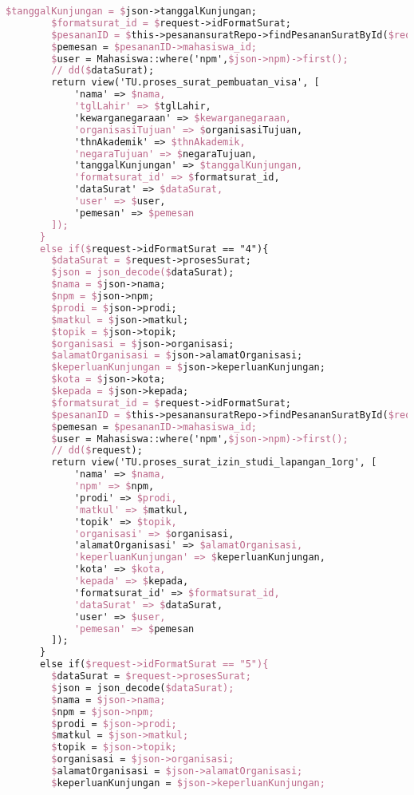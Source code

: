 \begin{lstlisting}[language=tex,basicstyle=\tiny,caption=PesanansuratController.php]
        $tanggalKunjungan = $json->tanggalKunjungan;
        $formatsurat_id = $request->idFormatSurat;
        $pesananID = $this->pesanansuratRepo->findPesananSuratById($request->id);
        $pemesan = $pesananID->mahasiswa_id;
        $user = Mahasiswa::where('npm',$json->npm)->first();
        // dd($dataSurat);
        return view('TU.proses_surat_pembuatan_visa', [
            'nama' => $nama,
            'tglLahir' => $tglLahir,
            'kewarganegaraan' => $kewarganegaraan,
            'organisasiTujuan' => $organisasiTujuan,
            'thnAkademik' => $thnAkademik,
            'negaraTujuan' => $negaraTujuan,
            'tanggalKunjungan' => $tanggalKunjungan,
            'formatsurat_id' => $formatsurat_id,
            'dataSurat' => $dataSurat,
            'user' => $user,
            'pemesan' => $pemesan
        ]);
      }
      else if($request->idFormatSurat == "4"){
        $dataSurat = $request->prosesSurat;
        $json = json_decode($dataSurat);
        $nama = $json->nama;
        $npm = $json->npm;
        $prodi = $json->prodi;
        $matkul = $json->matkul;
        $topik = $json->topik;
        $organisasi = $json->organisasi;
        $alamatOrganisasi = $json->alamatOrganisasi;
        $keperluanKunjungan = $json->keperluanKunjungan;
        $kota = $json->kota;
        $kepada = $json->kepada;
        $formatsurat_id = $request->idFormatSurat;
        $pesananID = $this->pesanansuratRepo->findPesananSuratById($request->id);
        $pemesan = $pesananID->mahasiswa_id;
        $user = Mahasiswa::where('npm',$json->npm)->first();
        // dd($request);
        return view('TU.proses_surat_izin_studi_lapangan_1org', [
            'nama' => $nama,
            'npm' => $npm,
            'prodi' => $prodi,
            'matkul' => $matkul,
            'topik' => $topik,
            'organisasi' => $organisasi,
            'alamatOrganisasi' => $alamatOrganisasi,
            'keperluanKunjungan' => $keperluanKunjungan,
            'kota' => $kota,
            'kepada' => $kepada,
            'formatsurat_id' => $formatsurat_id,
            'dataSurat' => $dataSurat,
            'user' => $user,
            'pemesan' => $pemesan
        ]);
      }
      else if($request->idFormatSurat == "5"){
        $dataSurat = $request->prosesSurat;
        $json = json_decode($dataSurat);
        $nama = $json->nama;
        $npm = $json->npm;
        $prodi = $json->prodi;
        $matkul = $json->matkul;
        $topik = $json->topik;
        $organisasi = $json->organisasi;
        $alamatOrganisasi = $json->alamatOrganisasi;
        $keperluanKunjungan = $json->keperluanKunjungan;

\end{lstlisting}
